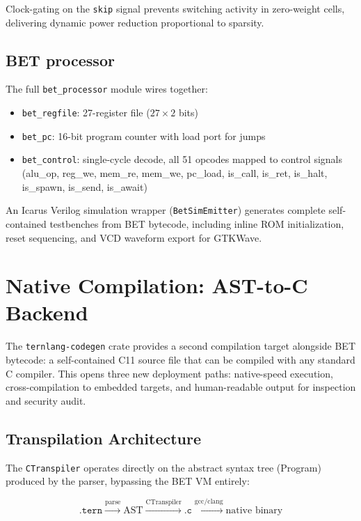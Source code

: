 \documentclass[11pt,a4paper]{article}
\begin{document}
Clock-gating on the \texttt{skip} signal prevents switching activity in
zero-weight cells, delivering dynamic power reduction proportional to sparsity.

\subsection{BET processor}

The full \texttt{bet\_processor} module wires together:
\begin{itemize}
  \item \texttt{bet\_regfile}: 27-register file ($27 \times 2$ bits)
  \item \texttt{bet\_pc}: 16-bit program counter with load port for jumps
  \item \texttt{bet\_control}: single-cycle decode, all 51 opcodes mapped to
        control signals (alu\_op, reg\_we, mem\_re, mem\_we, pc\_load,
        is\_call, is\_ret, is\_halt, is\_spawn, is\_send, is\_await)
\end{itemize}

An Icarus Verilog simulation wrapper (\texttt{BetSimEmitter}) generates
complete self-contained testbenches from BET bytecode, including inline ROM
initialization, reset sequencing, and VCD waveform export for GTKWave.

\section{Native Compilation: AST-to-C Backend}
\label{sec:codegen}

The \texttt{ternlang-codegen} crate provides a second compilation target
alongside BET bytecode: a self-contained C11 source file that can be compiled
with any standard C compiler. This opens three new deployment paths:
native-speed execution, cross-compilation to embedded targets, and human-readable
output for inspection and security audit.

\subsection{Transpilation Architecture}

The \texttt{CTranspiler} operates directly on the abstract syntax tree (Program)
produced by the parser, bypassing the BET VM entirely:

\begin{equation}
  \texttt{.tern} \xrightarrow{\text{parse}} \text{AST}
  \xrightarrow{\text{CTranspiler}} \texttt{.c}
  \xrightarrow{\text{gcc/clang}} \text{native binary}
  \label{eq:ctranspile}
\end{equation}
\end{document}
